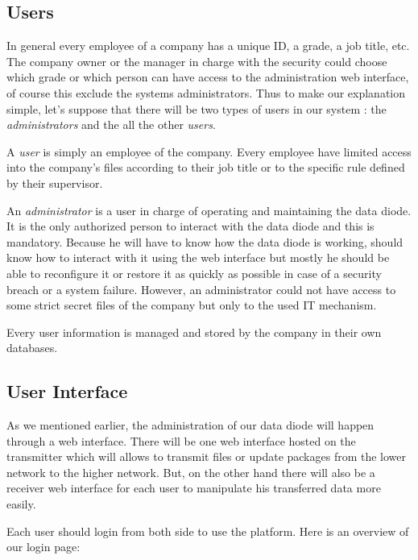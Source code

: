 \documentclass[a4paper,10pt]{article}
\begin{document}
\subsection{Users} 
In general every employee of a company has a unique ID, a grade, a job title, etc. The company owner or the manager in charge with the security could choose which grade or which person can have access to the administration web interface, of course this exclude the systems administrators.  Thus to make our explanation simple, let's suppose that there will be two types of users in our system : the \textit{administrators} and the all the other \textit{users}.

A \textit{user} is simply an employee of the company. Every employee have limited access into the company's files according to their job title or to the specific rule defined by their supervisor.

An \textit{administrator} is a user in charge of operating and maintaining the data diode. It is the only authorized person to interact with the data diode and this is mandatory. Because he will have to know how the data diode is working, should know how to interact with it using the web interface but mostly he should be able to reconfigure it or restore it as quickly as possible in case of a security breach or a system failure. However, an administrator could not have access to some strict secret files of the company but only to the used IT mechanism.

Every user information is managed and stored by the company in their own databases.

\subsection{User Interface}

As we mentioned earlier, the administration of our data diode will happen through a web interface. There will be one web interface hosted on the transmitter which will allows to transmit files or update packages from the lower network to the higher network. But, on the other hand there will also be a receiver web interface for each user to manipulate his transferred data more easily.

Each user should login from both side to use the platform. Here is an overview of our login page:
\end{document}
